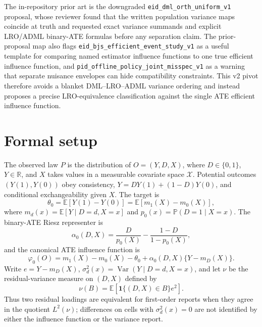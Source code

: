 \documentclass[11pt]{article}
\newcommand{\E}{\mathbb{E}}
\renewcommand{\Pr}{\mathbb{P}}
\newcommand{\one}{\mathbf{1}}
\newcommand{\R}{\mathbb{R}}
\theoremstyle{definition}
\theoremstyle{plain}
\theoremstyle{remark}
\begin{document}
The in-repository prior art is the downgraded \texttt{eid\_dml\_orth\_uniform\_v1} proposal, whose reviewer found that the written population variance maps coincide at truth and requested exact variance summands and explicit LRO/ADML binary-ATE formulas before any separation claim.  The prior-proposal map also flags \texttt{eid\_bjs\_efficient\_event\_study\_v1} as a useful template for comparing named estimator influence functions to one true efficient influence function, and \texttt{pid\_offline\_policy\_joint\_misspec\_v1} as a warning that separate nuisance envelopes can hide compatibility constraints.  This v2 pivot therefore avoids a blanket DML--LRO--ADML variance ordering and instead proposes a precise LRO-equivalence classification against the single ATE efficient influence function.

\section{Formal setup}
The observed law $P$ is the distribution of $O=(Y,D,X)$, where $D\in\{0,1\}$, $Y\in\R$, and $X$ takes values in a measurable covariate space $\mathcal X$.  Potential outcomes $(Y(1),Y(0))$ obey consistency, $Y=DY(1)+(1-D)Y(0)$, and conditional exchangeability given $X$.  The target is
\[
  \theta_0=\E[Y(1)-Y(0)]
  =\E[m_1(X)-m_0(X)],
\]
where $m_d(x)=\E[Y\mid D=d,X=x]$ and $p_0(x)=\Pr(D=1\mid X=x)$.  The binary-ATE Riesz representer is
\[
  \alpha_0(D,X)=\frac{D}{p_0(X)}-\frac{1-D}{1-p_0(X)},
\]
and the canonical ATE influence function is
\[
  \varphi_0(O)=m_1(X)-m_0(X)-\theta_0+\alpha_0(D,X)\{Y-m_D(X)\}.
\]
Write $e=Y-m_D(X)$, $\sigma_d^2(x)=\operatorname{Var}(Y\mid D=d,X=x)$, and let $\nu$ be the residual-variance measure on $(D,X)$ defined by
\[
  \nu(B)=\E[\one\{(D,X)\in B\}e^2].
\]
Thus two residual loadings are equivalent for first-order reports when they agree in the quotient $L^2(\nu)$; differences on cells with $\sigma_d^2(x)=0$ are not identified by either the influence function or the variance report.
\end{document}
